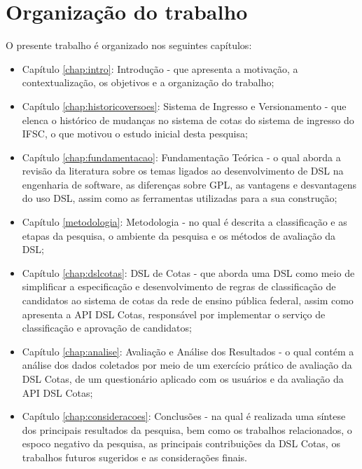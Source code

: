 \section{Organização do trabalho}
\label{organizacao}

O presente trabalho é organizado nos seguintes capítulos:

\begin{itemize}
    \item Capítulo \ref{chap:intro}: Introdução - que apresenta a motivação, a contextualização, os objetivos e a organização do trabalho;
    \item Capítulo \ref{chap:historicoversoes}: Sistema de Ingresso e Versionamento - que elenca o histórico de mudanças no sistema de cotas do sistema de ingresso do \gls{IFSC}, o que motivou o estudo inicial desta pesquisa;
    
    \item Capítulo \ref{chap:fundamentacao}: Fundamentação Teórica - o qual aborda a revisão da literatura sobre os temas ligados ao desenvolvimento de \gls{DSL} na engenharia de software, as diferenças sobre \gls{GPL}, as vantagens e desvantagens do uso  \gls{DSL}, assim como as ferramentas utilizadas para a sua construção;
        
    \item Capítulo \ref{metodologia}: Metodologia - no qual é descrita a classificação e as etapas da pesquisa, o ambiente da pesquisa e os métodos de avaliação da DSL;

    \item Capítulo \ref{chap:dslcotas}: DSL de Cotas - que aborda uma \gls{DSL} como meio de simplificar a especificação e desenvolvimento de regras de classificação de candidatos ao sistema de cotas da rede de ensino pública federal, assim como apresenta a \gls{API} DSL Cotas, responsável por implementar o serviço de classificação e aprovação de candidatos;
    \item Capítulo \ref{chap:analise}: Avaliação e Análise dos Resultados - o qual contém a análise dos dados coletados por meio de um exercício prático de avaliação da DSL Cotas, de um questionário aplicado com os usuários e da avaliação da
    \gls{API} DSL Cotas;
    \item Capítulo \ref{chap:consideracoes}: Conclusões - na qual é realizada uma síntese dos principais resultados da pesquisa, bem como os trabalhos relacionados, o espoco negativo da pesquisa, as principais contribuições da DSL Cotas, os trabalhos futuros sugeridos e as considerações finais.
\end{itemize}
